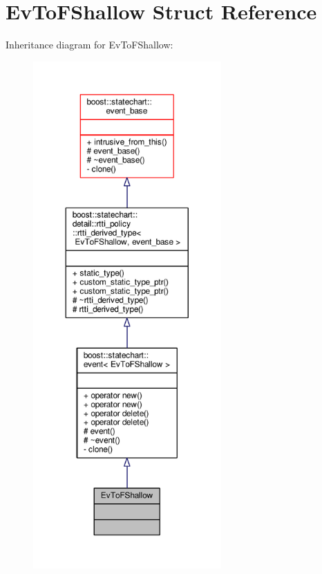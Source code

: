 \hypertarget{struct_ev_to_f_shallow}{}\section{Ev\+To\+F\+Shallow Struct Reference}
\label{struct_ev_to_f_shallow}


Inheritance diagram for Ev\+To\+F\+Shallow\+:
\nopagebreak
\begin{figure}[H]
\begin{center}
\leavevmode
\includegraphics[height=550pt]{struct_ev_to_f_shallow__inherit__graph}
\end{center}
\end{figure}


